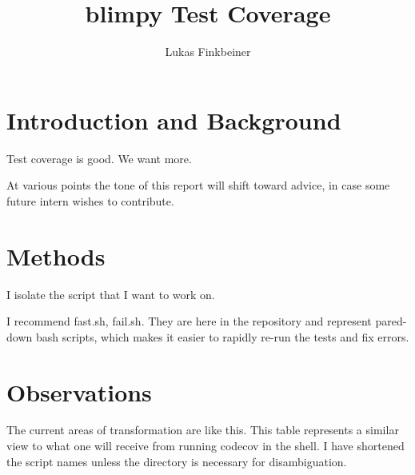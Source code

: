 \documentclass[12pt]{article}
\title{blimpy Test Coverage}
\author{Lukas Finkbeiner}
\begin{document}
\maketitle


\section{Introduction and Background}

\quad \quad Test coverage is good. We want more.

At various points the tone of this report will shift toward advice, in case some future intern wishes to contribute.

\section{Methods}

\quad \quad I isolate the script that I want to work on.

I recommend fast.sh, fail.sh. They are here in the repository and represent pared-down bash scripts, which makes it easier to rapidly re-run the tests and fix errors.

\section{Observations}

\quad \quad The current areas of transformation are like this. This table represents a similar view to what one will receive from running codecov in the shell. I have shortened the script names unless the directory is necessary for disambiguation.
\end{document}
